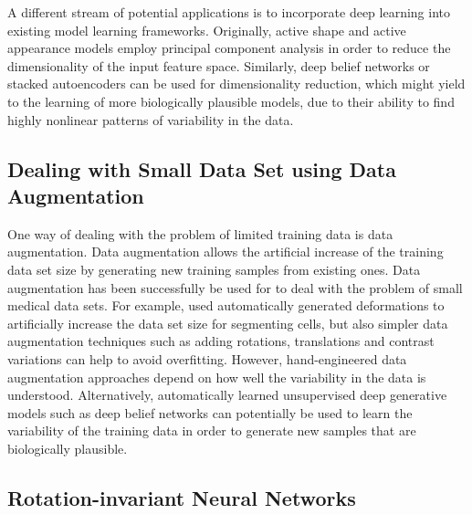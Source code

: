 A different stream of potential applications is to incorporate deep learning
into existing model learning frameworks. Originally, active shape
\cite{cootes1995} and active appearance \cite{cootes2001q} models employ
principal component analysis in order to reduce the dimensionality of the input
feature space. Similarly, deep belief networks or stacked autoencoders can be
used for dimensionality reduction, which might yield to the learning of more
biologically plausible models, due to their ability to find highly nonlinear
patterns of variability in the data.

\subsection[Dealing with small data set using data augmentation]{Dealing with
Small Data Set using Data Augmentation}

One way of dealing with the problem of limited training data is data
augmentation. Data augmentation allows the artificial increase of the training
data set size by generating new training samples from existing ones. Data
augmentation has been successfully be used for to deal with the problem of small
medical data sets. For example, \citet{ronneberger2015} used automatically
generated deformations to artificially increase the data set size for segmenting
cells, but also simpler data augmentation techniques such as adding rotations,
translations and contrast variations can help to avoid overfitting. However,
hand-engineered data augmentation approaches depend on how well the variability
in the data is understood. Alternatively, automatically learned unsupervised
deep generative models such as deep belief networks can potentially be used to
learn the variability of the training data in order to generate new samples that
are biologically plausible.

\subsection[Rotation-invariant neural networks]{Rotation-invariant Neural
Networks}

